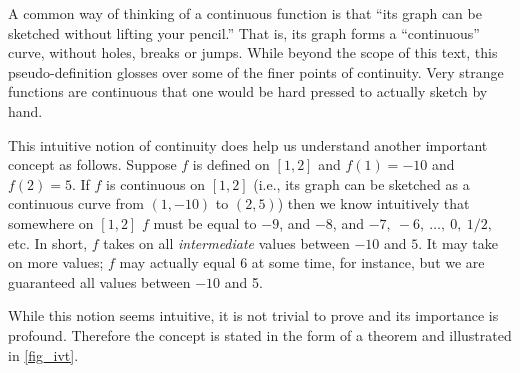 A common way of thinking of a continuous function is that ``its graph can be sketched without lifting your pencil.'' That is, its graph forms a ``continuous'' curve, without holes, breaks or jumps. While beyond the scope of this text, this pseudo-definition glosses over some of the finer points of continuity. Very strange functions are continuous that one would be hard pressed to actually sketch by hand. 

This intuitive notion of continuity does help us understand another important concept as follows. Suppose $f$ is defined on $[1,2]$ and $f(1) = -10$ and $f(2) = 5$. If $f$ is continuous on $[1,2]$ (i.e., its graph can be sketched as a continuous curve from $(1,-10)$ to $(2,5)$) then we know intuitively that somewhere on $[1,2]$ $f$ must be equal to $-9$, and $-8$, and $-7,\ -6,\ \dotsc,\ 0,\ 1/2,$ etc. In short, $f$ takes on all \emph{intermediate} values between $-10$ and $5$. It may take on more values; $f$ may actually equal 6 at some time, for instance, but we are guaranteed all values between $-10$ and 5. 

While this notion seems intuitive, it is not trivial to prove and its importance is profound. Therefore the concept is stated in the form of a theorem and illustrated in \autoref{fig_ivt}.

